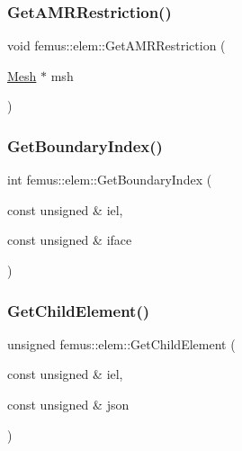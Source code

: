 \mbox{\label{classfemus_1_1elem_a822ba86baca0f55483331479b78b6411}} 
\subsubsection{\texorpdfstring{Get\+A\+M\+R\+Restriction()}{GetAMRRestriction()}}
{\footnotesize\ttfamily void femus\+::elem\+::\+Get\+A\+M\+R\+Restriction (\begin{DoxyParamCaption}\item[{\mbox{\hyperlink{classfemus_1_1_mesh}{Mesh}} $\ast$}]{msh }\end{DoxyParamCaption})}

\mbox{\label{classfemus_1_1elem_a54ac1afbd613fe46b8c98be14a1c896f}} 
\subsubsection{\texorpdfstring{Get\+Boundary\+Index()}{GetBoundaryIndex()}}
{\footnotesize\ttfamily int femus\+::elem\+::\+Get\+Boundary\+Index (\begin{DoxyParamCaption}\item[{const unsigned \&}]{iel,  }\item[{const unsigned \&}]{iface }\end{DoxyParamCaption})}

\mbox{\label{classfemus_1_1elem_a743da48a9fee9fbb5091cd71a2e5bc98}} 
\subsubsection{\texorpdfstring{Get\+Child\+Element()}{GetChildElement()}}
{\footnotesize\ttfamily unsigned femus\+::elem\+::\+Get\+Child\+Element (\begin{DoxyParamCaption}\item[{const unsigned \&}]{iel,  }\item[{const unsigned \&}]{json }\end{DoxyParamCaption})}

